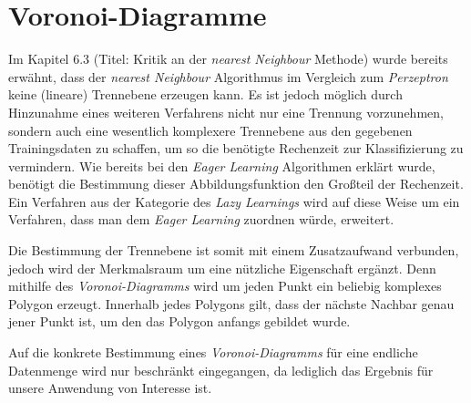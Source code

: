 \documentclass[fontsize=11pt]{scrartcl}
\begin{document}
        \section{Voronoi-Diagramme}
            Im Kapitel 6.3 (Titel: Kritik an der \emph{nearest Neighbour} Methode) wurde bereits erwähnt, dass der \emph{nearest Neighbour} Algorithmus im Vergleich zum \emph{Perzeptron} keine (lineare) Trennebene erzeugen kann. Es ist jedoch möglich durch Hinzunahme eines weiteren Verfahrens nicht nur eine Trennung vorzunehmen, sondern auch eine wesentlich komplexere Trennebene aus den gegebenen Trainingsdaten zu schaffen, um so die benötigte Rechenzeit zur Klassifizierung zu vermindern.\cite{ertel2016_p209}
            Wie bereits bei den \emph{Eager Learning} Algorithmen erklärt wurde, benötigt die Bestimmung dieser Abbildungsfunktion den Großteil der Rechenzeit. Ein Verfahren aus der Kategorie des \emph{Lazy Learnings} wird auf diese Weise um ein Verfahren, dass man dem \emph{Eager Learning} zuordnen würde, erweitert.\par Die Bestimmung der Trennebene ist somit mit einem Zusatzaufwand verbunden, jedoch wird der Merkmalsraum um eine nützliche Eigenschaft ergänzt. Denn mithilfe des \emph{Voronoi-Diagramms} wird um jeden Punkt ein beliebig komplexes Polygon erzeugt. Innerhalb jedes Polygons gilt, dass der nächste Nachbar genau jener Punkt ist, um den das Polygon anfangs gebildet wurde.\cite{ertel2016_p208} \par
            
            Auf die konkrete Bestimmung eines \emph{Voronoi-Diagramms} für eine endliche Datenmenge wird nur beschränkt eingegangen, da lediglich das Ergebnis für unsere Anwendung von Interesse ist. %
                        
\end{document}
